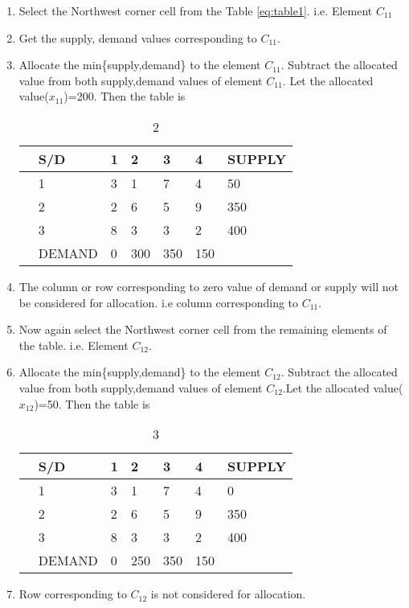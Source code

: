 \documentclass[journal,12pt,twocolumn]{IEEEtran}
\begin{document}
\begin{enumerate}[1.]
\item 
Select the Northwest corner cell from the Table \ref{eq:table1}. i.e. Element $C_{11}$
\item 
Get the supply, demand values corresponding to $C_{11}$. 
\item
Allocate the min\{supply,demand\} to the element $C_{11}$. Subtract the allocated value from both supply,demand values of element $C_{11}$. Let the allocated value($x_{11}$)=200. Then the table is
\begin{table}[!h]
\begin{center}
\begin{tabular}{l  l | l l l l | l  }
                 
                 & S/D & 1 & 2 & 3 & 4 &  SUPPLY  \\
\hline
& 1 & 3 & 1 & 7 & 4 & 50 \\ 
& 2 & 2 & 6 & 5 & 9 & 350  \\ 
& 3 & 8 & 3 & 3 & 2 & 400 \\ 
\hline
&DEMAND& 0&300&350&150\\ 
\end{tabular}
\end{center}
\caption{2}
\end{table}

\item The column or row corresponding to zero value of demand or supply will not be considered for allocation. i.e column corresponding to $C_{11}$.
\item Now again select the Northwest corner cell from the remaining elements of the table.  i.e. Element $C_{12}$.
\item
Allocate the min\{supply,demand\} to the element $C_{12}$. Subtract the allocated value from both supply,demand values of element $C_{12}$.Let the allocated value($x_{12}$)=50. Then the table is
\begin{table}[!h]
\begin{center}
\begin{tabular}{l  l | l l l l | l  }
                 
                 & S/D & 1 & 2 & 3 & 4 &  SUPPLY  \\
\hline
& 1 & 3 & 1 & 7 & 4 & 0 \\ 
& 2 & 2 & 6 & 5 & 9 & 350  \\ 
& 3 & 8 & 3 & 3 & 2 & 400 \\ 
\hline
&DEMAND& 0&250&350&150\\ 
\end{tabular}
\end{center}
\caption{3}
\end{table}
\item Row corresponding to $C_{12}$ is not considered for allocation.


\end{enumerate}
\end{document}
